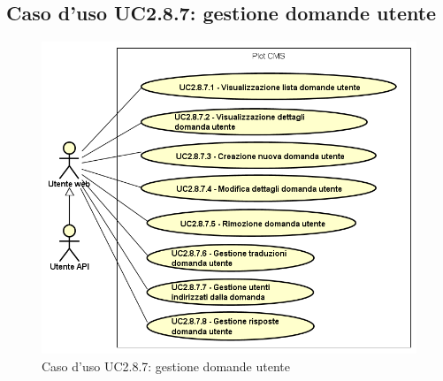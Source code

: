 \subsection{Caso d'uso UC2.8.7: gestione domande utente}

        \begin{figure}[H]
            \centering
            \includegraphics[scale=0.95, width=\textwidth]{immagini/usecase/UC2-8-7.png}
            \caption{Caso d'uso UC2.8.7: gestione domande utente}\label{fig:UC2.8.7} 
        \end{figure}
